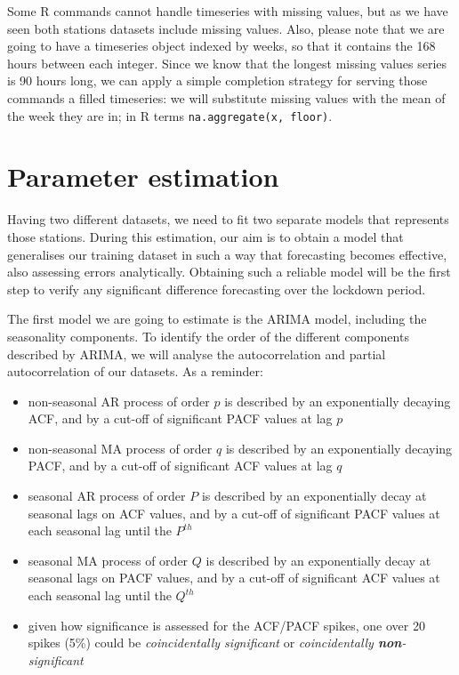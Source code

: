 \documentclass[12pt]{article}
\begin{document}
Some R commands cannot handle timeseries with missing values, but as we have seen both stations datasets include missing values.
Also, please note that we are going to have a timeseries object indexed by weeks, so that it contains the 168 hours between each integer.
Since we know that the longest missing values series is 90 hours long, we can apply a simple completion strategy for serving those commands a filled timeseries: we will substitute missing values with the mean of the week they are in; in R terms \texttt{na.aggregate(x, floor)}.


\section{Parameter estimation}
Having two different datasets, we need to fit two separate models that represents those stations. During this estimation, our aim is to obtain a model that generalises our training dataset in such a way that forecasting becomes effective, also assessing errors analytically.
Obtaining such a reliable model will be the first step to verify any significant difference forecasting over the lockdown period.

The first model we are going to estimate is the ARIMA model, including the seasonality components. To identify the order of the different components described by ARIMA, we will analyse the autocorrelation and partial autocorrelation of our datasets.
As a reminder:
\begin{itemize}[topsep=0.5em,itemsep=0em,partopsep=0.5em]
	\item non-seasonal AR process of order $p$ is described by an exponentially decaying ACF, and by a cut-off of significant PACF values at lag $p$
	\item non-seasonal MA process of order $q$ is described by an exponentially decaying PACF, and by a cut-off of significant ACF values at lag $q$
	\item seasonal AR process of order $P$ is described by an exponentially decay at seasonal lags on ACF values, and by a cut-off of significant PACF values at each seasonal lag until the $P^{th}$
	\item seasonal MA process of order $Q$ is described by an exponentially decay at seasonal lags on PACF values, and by a cut-off of significant ACF values at each seasonal lag until the $Q^{th}$
	\item given how significance is assessed for the ACF/PACF spikes, one over 20 spikes (5\%) could be \textit{coincidentally significant} or \textit{coincidentally \textbf{non}-significant}
\end{itemize}
\end{document}
